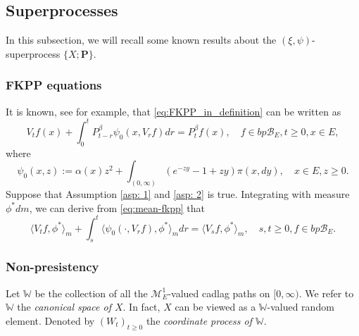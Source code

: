 \documentclass[12pt, a4paper]{amsart}
\theoremstyle{definition}
\numberwithin{equation}{section}
\begin{document}
\subsection{Superprocesses}
\label{sec: Superprocesses}
	In this subsection, we will recall some known results about the $(\xi, \psi)$-superprocess $\{X; \mathbf P\}$. 
\subsubsection{FKPP equations}
	It is known, see \cite[Theorem 2.23]{Li2011Measure-valued} for example, that \eqref{eq:FKPP_in_definition} can be written as
\[\label{eq:mean-fkpp}
	V_t f(x) + \int_0^t P^\beta_{t-r} \psi_0(x,V_r f) dr
	= P^\beta_t f(x),
	\quad f \in bp\mathscr B_E, t \geq 0,x \in E,
\]
	where
\[
	\psi_0(x,z)
	:= \alpha(x) z^2 + \int_{(0,\infty)} (e^{-z y} - 1 + z y) \pi(x,dy),
	\quad x \in E,z \geq 0.
\]
	Suppose that Assumption \ref{asp: 1} and \ref{asp: 2} is true. Integrating with measure $\phi^*dm$, we can derive from \eqref{eq:mean-fkpp} that
	\[\label{eq:langleVtfphiranglem_equation}
	 \langle V_tf,\phi^*\rangle_m + \int_s^t \langle \psi_0(\cdot ,V_r f) , \phi^*\rangle_mdr 
	= \langle V_sf,\phi^*\rangle_m,
	\quad s,t\geq 0, f\in bp\mathscr B_E.
	\]

\subsubsection{Non-presistency} 
	Let $\mathbb W$ be the collection of all the $\mathcal M^1_E$-valued cadlag paths on $[0,\infty)$. 
	We refer to $\mathbb W$ the \emph{canonical space of $X$}.
	In fact, $X$ can be viewed as a $\mathbb W$-valued random element. 
	Denoted by $(W_t)_{t\geq 0}$ the \emph{coordinate process of $\mathbb W$}.
\end{document}
